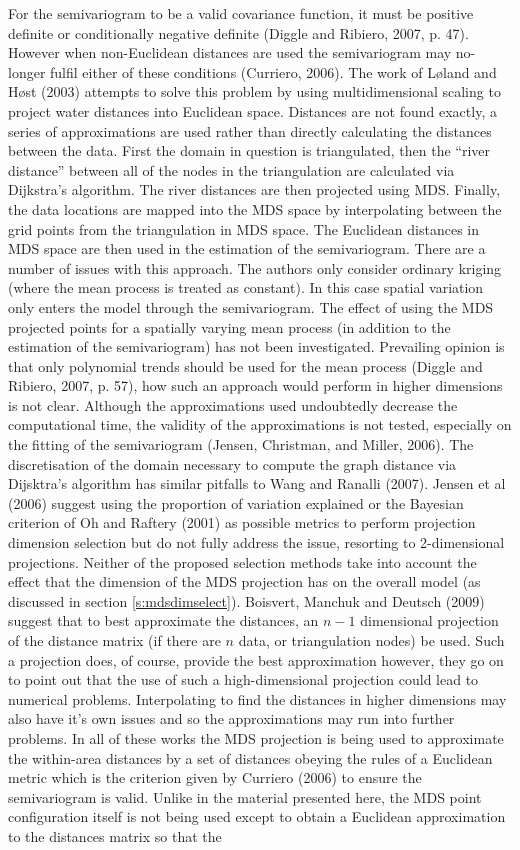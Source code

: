 \documentclass[useAMS, referee]{biom}
\begin{document}
For the semivariogram to be a valid covariance function, it must be positive definite or conditionally negative definite (Diggle and Ribiero, 2007, p. 47). However when non-Euclidean distances are used the semivariogram may no-longer fulfil either of these conditions (Curriero, 2006). The work of L{\o}land and H{\o}st (2003) attempts to solve this problem by using multidimensional scaling to project water distances into Euclidean space. Distances are not found exactly, a series of approximations are used rather than directly calculating the distances between the data. First the domain in question is triangulated, then the ``river distance'' between all of the nodes in the triangulation are calculated via Dijkstra's algorithm. The river distances are then projected using MDS. Finally, the data locations are mapped into the MDS space by interpolating between the grid points from the triangulation in MDS space.  The Euclidean distances in MDS space are then	 used in the estimation of the semivariogram. There are a number of issues with this approach. The authors only consider ordinary kriging (where the mean process is treated as constant). In this case spatial variation only enters the model through the semivariogram. The effect of using the MDS projected points for a spatially varying mean process (in addition to the estimation of the semivariogram) has not been investigated. Prevailing opinion is that only polynomial trends should be used for the mean process (Diggle and Ribiero, 2007, p. 57), how such an approach would perform in higher dimensions is not clear. Although the approximations used undoubtedly decrease the computational time, the validity of the approximations is not tested, especially on the fitting of the semivariogram (Jensen, Christman, and Miller, 2006). The discretisation of the domain necessary to compute the graph distance via Dijsktra's algorithm has similar pitfalls to Wang and Ranalli (2007). Jensen et al (2006) suggest using the proportion of variation explained or the Bayesian criterion of Oh and Raftery (2001) as possible metrics to perform projection dimension selection but do not fully address the issue, resorting to 2-dimensional projections. Neither of the proposed selection methods take into account the effect that the dimension of the MDS projection has on the overall model (as discussed in section \ref{s:mdsdimselect}). Boisvert, Manchuk and Deutsch (2009) suggest that to best approximate the distances, an $n-1$ dimensional projection of the distance matrix (if there are $n$ data, or triangulation nodes) be used. Such a projection does, of course, provide the best approximation however, they go on to point out that the use of such a high-dimensional projection could lead to numerical problems. Interpolating to find the distances in higher dimensions may also have it's own issues and so the approximations may run into further problems. In all of these works the MDS projection is being used to approximate the within-area distances by a set of distances obeying the rules of a Euclidean metric which is the criterion given by Curriero (2006) to ensure the semivariogram is valid. Unlike in the material presented here, the MDS point configuration itself is not being used except to obtain a Euclidean approximation to the distances matrix so that the 
\end{document}
